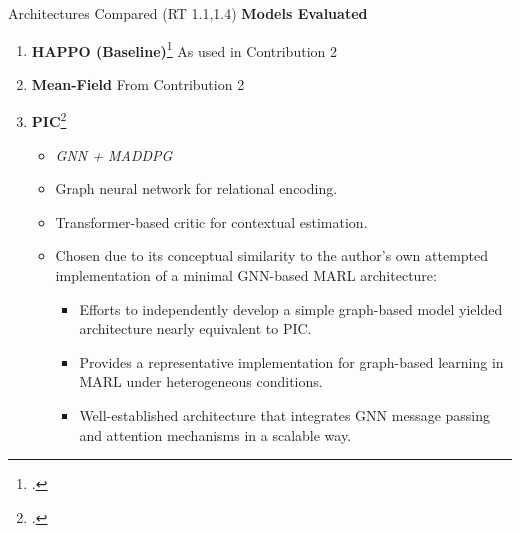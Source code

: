 \begin{frame}{Architectures Compared (RT 1.1,1.4)}
    \textbf{Models Evaluated}
    \begin{enumerate}
        \item \textbf{HAPPO (Baseline)}\footcite{zhong2024} As used in Contribution 2
        \item \textbf{Mean-Field } From Contribution 2
        \item \textbf{PIC}\footcite{liu2020b}
          \begin{itemize}
            \item \emph{GNN + MADDPG}
            \item Graph neural network for relational encoding.
            \item Transformer-based critic for contextual estimation.
            \item Chosen due to its conceptual similarity to the author's own attempted 
                implementation of a minimal GNN-based MARL architecture:
            \begin{itemize}
                \item Efforts to independently develop a simple graph-based model yielded architecture nearly equivalent to PIC.
                \item Provides a representative implementation for graph-based learning in MARL under heterogeneous conditions.
                \item Well-established architecture that integrates GNN message passing and attention mechanisms in a scalable way.
            \end{itemize}
          \end{itemize}
    \end{enumerate}
\end{frame}


